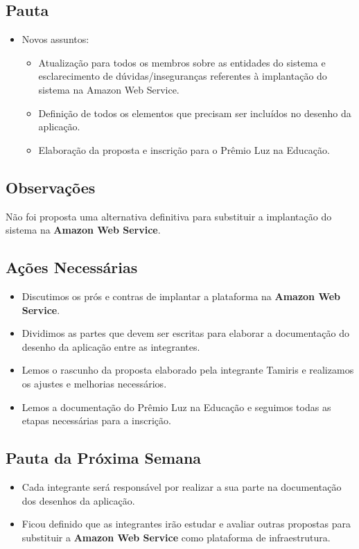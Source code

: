 \begin{apendicesenv}
\subsection*{Pauta}
\begin{itemize}
    \item Novos assuntos:
    \begin{itemize}
        \item Atualização para todos os membros sobre as entidades do sistema e esclarecimento de dúvidas/inseguranças referentes à implantação do sistema na Amazon Web Service.
        \item Definição de todos os elementos que precisam ser incluídos no desenho da aplicação.
        \item Elaboração da proposta e inscrição para o Prêmio Luz na Educação.
    \end{itemize}
\end{itemize}

\subsection*{Observações}
Não foi proposta uma alternativa definitiva para substituir a implantação do sistema na \textbf{Amazon Web Service}.

\subsection*{Ações Necessárias}
\begin{itemize}
    \item Discutimos os prós e contras de implantar a plataforma na \textbf{Amazon Web Service}.
    \item Dividimos as partes que devem ser escritas para elaborar a documentação do desenho da aplicação entre as integrantes.
    \item Lemos o rascunho da proposta elaborado pela integrante Tamiris e realizamos os ajustes e melhorias necessários.
    \item Lemos a documentação do Prêmio Luz na Educação e seguimos todas as etapas necessárias para a inscrição.
\end{itemize}

\subsection*{Pauta da Próxima Semana}
\begin{itemize}
    \item Cada integrante será responsável por realizar a sua parte na documentação dos desenhos da aplicação.
    \item Ficou definido que as integrantes irão estudar e avaliar outras propostas para substituir a \textbf{Amazon Web Service} como plataforma de infraestrutura.
\end{itemize}


\end{apendicesenv}
